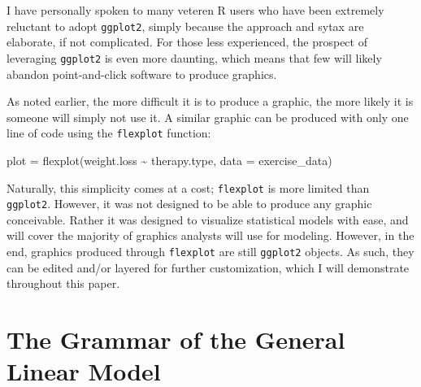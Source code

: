 \documentclass[
  english,
  man]{apa6}
\newenvironment{Shaded}{\begin{snugshade}}{\end{snugshade}}
\newcommand{\AttributeTok}[1]{\textcolor[rgb]{0.77,0.63,0.00}{#1}}
\newcommand{\FunctionTok}[1]{\textcolor[rgb]{0.00,0.00,0.00}{#1}}
\newcommand{\NormalTok}[1]{#1}
\newcommand{\OtherTok}[1]{\textcolor[rgb]{0.56,0.35,0.01}{#1}}
\newcommand{\SpecialCharTok}[1]{\textcolor[rgb]{0.00,0.00,0.00}{#1}}
\begin{document}
\normalsize

I have personally spoken to many veteren R users who have been extremely reluctant to adopt \texttt{ggplot2}, simply because the approach and sytax are elaborate, if not complicated. For those less experienced, the prospect of leveraging \texttt{ggplot2} is even more daunting, which means that few will likely abandon point-and-click software to produce graphics.

As noted earlier, the more difficult it is to produce a graphic, the more likely it is someone will simply not use it. A similar graphic can be produced with only one line of code using the \texttt{flexplot} function:

\small

\begin{Shaded}
\begin{Highlighting}[]
\NormalTok{plot }\OtherTok{=} \FunctionTok{flexplot}\NormalTok{(weight.loss }\SpecialCharTok{\textasciitilde{}}\NormalTok{ therapy.type, }\AttributeTok{data =}\NormalTok{ exercise\_data)}
\end{Highlighting}
\end{Shaded}

\normalsize

Naturally, this simplicity comes at a cost; \texttt{flexplot} is more limited than \texttt{ggplot2}. However, it was not designed to be able to produce any graphic conceivable. Rather it was designed to visualize statistical models with ease, and will cover the majority of graphics analysts will use for modeling. However, in the end, graphics produced through \texttt{flexplot} are still \texttt{ggplot2} objects. As such, they can be edited and/or layered for further customization, which I will demonstrate throughout this paper.

\hypertarget{the-grammar-of-the-general-linear-model}{%
\section{The Grammar of the General Linear Model}\label{the-grammar-of-the-general-linear-model}}
\end{document}
